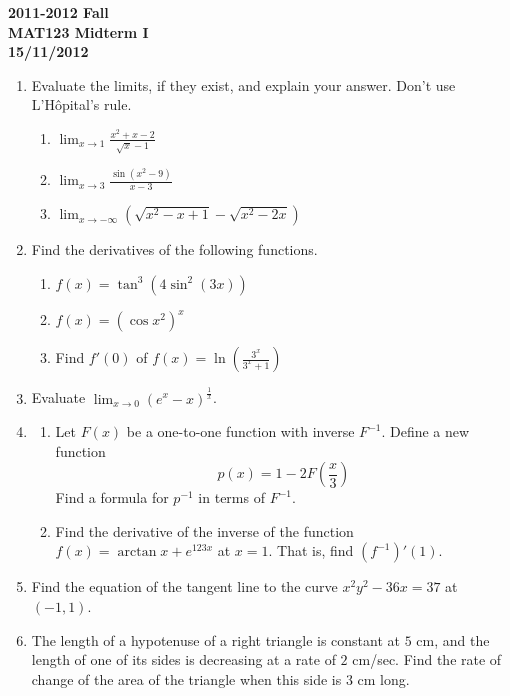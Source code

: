 \documentclass[a4paper, 12pt]{article}
\begin{document}
\pagestyle{empty}

\begin{center}
\textbf{2011-2012 Fall\\MAT123 Midterm I\\15/11/2012}
\end{center}

\begin{enumerate}[leftmargin=*,label=\textbf{\arabic*.}]
\item Evaluate the limits, if they exist, and explain your answer. Don't use L'Hôpital's rule.

\begin{enumerate}[leftmargin=*,label=\textbf{\alph*.}]
\item $\displaystyle \lim_{x\to 1} \frac{x^2+x-2}{\sqrt x-1}$
\item $\displaystyle \lim_{x\to 3} \frac{\sin(x^2-9)}{x-3}$
\item $\displaystyle \lim_{x\to -\infty}\left(\sqrt{x^2-x+1}-\sqrt{x^2-2x}\right)$
\end{enumerate}

\item Find the derivatives of the following functions.

\begin{enumerate}[leftmargin=*,label=\textbf{\alph*.}]
\item $\displaystyle f(x) = \tan^3\left(4\sin^2(3x)\right)$
\item $\displaystyle f(x) = \left(\cos x^2\right)^x$
\item Find $f'(0)$ of $\displaystyle f(x)=\ln\left(\frac{3^x}{3^x+1}\right)$
\end{enumerate}

\item Evaluate $\displaystyle \lim_{x\to0}\left( e^x-x\right)^{\frac1x}$.

\item
\begin{enumerate}[leftmargin=*,label=\textbf{\alph*.}]
\item Let $F(x)$ be a one-to-one function with inverse $F^{-1}$. Define a new function
\[p(x) = 1-2F\left(\frac x3\right)\]
Find a formula for $p^{-1}$ in terms of $F^{-1}$.
\item Find the derivative of the inverse of the function $f(x) = \arctan x +  e^{123x}$ at $x=1$. That is, find $\left(f^{-1}\right)'(1)$.
\end{enumerate}

\item Find the equation of the tangent line to the curve $x^2y^2-36x=37$ at $(-1, 1)$.

\item The length of a hypotenuse of a right triangle is constant at $5$ cm, and the
length of one of its sides is decreasing at a rate of $2$ cm/sec. Find the rate of change of the area of the triangle when this side is $3$ cm long.
\end{enumerate}
\end{document}
